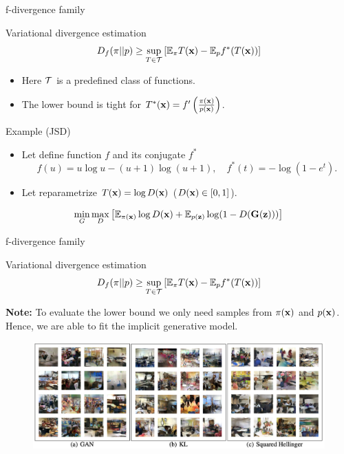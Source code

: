 \begin{frame}{f-divergence family}
	\begin{block}{Variational divergence estimation}
		\vspace{-0.2cm}
		\[
			D_f(\pi || p) \geq \sup_{T \in \mathcal{T}} \left[\mathbb{E}_{\pi}T(\mathbf{x}) -  \mathbb{E}_p f^*(T(\mathbf{x})) \right]
		\]
		\vspace{-0.3cm}
		\begin{itemize}
			\item Here $\mathcal{T}$ is a predefined class of functions.
			\item The lower bound is tight for $T^*(\mathbf{x}) = f'\left( \frac{\pi(\mathbf{x})}{p(\mathbf{x})} \right)$. 
		\end{itemize}
		\vspace{-0.3cm}
	\end{block}
	\begin{block}{Example (JSD)}
		\begin{itemize}
			\item Let define function $f$ and its conjugate $f^*$
			\[ 
				f(u) = u \log u - (u + 1) \log (u + 1), \quad f^*(t) = - \log (1 - e^t).
			\]
			\item Let reparametrize $T(\mathbf{x}) = \log D(\mathbf{x})$ ($D(\mathbf{x}) \in [0, 1]$).
		\end{itemize}
		\vspace{-0.4cm}
	\end{block}
	\[
		\min_{G} \max_D \left[ \mathbb{E}_{\pi(\mathbf{x})} \log D(\mathbf{x}) + \mathbb{E}_{p(\mathbf{z})} \log (1 - D(\mathbf{G}(\mathbf{z}))) \right]
	\]

\end{frame}
\begin{frame}{f-divergence family}
	\begin{block}{Variational divergence estimation}
		\[
			D_f(\pi || p) \geq \sup_{T \in \mathcal{T}} \left[\mathbb{E}_{\pi}T(\mathbf{x}) -  \mathbb{E}_p f^*(T(\mathbf{x})) \right]
		\]
		\vspace{-0.3cm}
	\end{block}
	\textbf{Note:} To evaluate the lower bound we only need samples from $\pi(\mathbf{x})$ and $p(\mathbf{x})$. Hence, we are able to fit the implicit generative model.
	\begin{figure}
		\centering
		\includegraphics[width=1.0\linewidth]{figs/f_div_results}
	\end{figure}

\end{frame}
